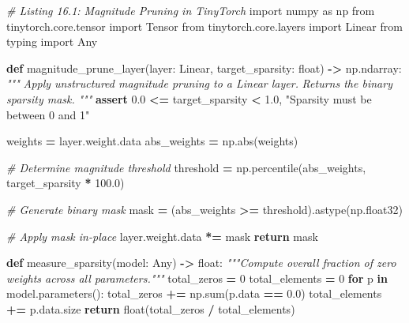 \documentclass[
  letterpaper,
]{scrbook}
\newenvironment{Shaded}{\begin{snugshade}}{\end{snugshade}}
\newcommand{\BuiltInTok}[1]{#1}
\newcommand{\CommentTok}[1]{\textcolor[rgb]{0.56,0.35,0.01}{\textit{#1}}}
\newcommand{\ControlFlowTok}[1]{\textcolor[rgb]{0.13,0.29,0.53}{\textbf{#1}}}
\newcommand{\DecValTok}[1]{\textcolor[rgb]{0.00,0.00,0.81}{#1}}
\newcommand{\FloatTok}[1]{\textcolor[rgb]{0.00,0.00,0.81}{#1}}
\newcommand{\ImportTok}[1]{#1}
\newcommand{\KeywordTok}[1]{\textcolor[rgb]{0.13,0.29,0.53}{\textbf{#1}}}
\newcommand{\NormalTok}[1]{#1}
\newcommand{\OperatorTok}[1]{\textcolor[rgb]{0.81,0.36,0.00}{\textbf{#1}}}
\newcommand{\StringTok}[1]{\textcolor[rgb]{0.31,0.60,0.02}{#1}}
\begin{document}
\begin{Shaded}
\begin{Highlighting}[]
\CommentTok{\# Listing 16.1: Magnitude Pruning in TinyTorch}
\ImportTok{import}\NormalTok{ numpy }\ImportTok{as}\NormalTok{ np}
\ImportTok{from}\NormalTok{ tinytorch.core.tensor }\ImportTok{import}\NormalTok{ Tensor}
\ImportTok{from}\NormalTok{ tinytorch.core.layers }\ImportTok{import}\NormalTok{ Linear}
\ImportTok{from}\NormalTok{ typing }\ImportTok{import}\NormalTok{ Any}

\KeywordTok{def}\NormalTok{ magnitude\_prune\_layer(layer: Linear, target\_sparsity: }\BuiltInTok{float}\NormalTok{) }\OperatorTok{{-}\textgreater{}}\NormalTok{ np.ndarray:}
    \CommentTok{"""}
\CommentTok{    Apply unstructured magnitude pruning to a Linear layer.}
\CommentTok{    Returns the binary sparsity mask.}
\CommentTok{    """}
    \ControlFlowTok{assert} \FloatTok{0.0} \OperatorTok{\textless{}=}\NormalTok{ target\_sparsity }\OperatorTok{\textless{}} \FloatTok{1.0}\NormalTok{, }\StringTok{"Sparsity must be between 0 and 1"}

\NormalTok{    weights }\OperatorTok{=}\NormalTok{ layer.weight.data}
\NormalTok{    abs\_weights }\OperatorTok{=}\NormalTok{ np.}\BuiltInTok{abs}\NormalTok{(weights)}

    \CommentTok{\# Determine magnitude threshold}
\NormalTok{    threshold }\OperatorTok{=}\NormalTok{ np.percentile(abs\_weights, target\_sparsity }\OperatorTok{*} \FloatTok{100.0}\NormalTok{)}

    \CommentTok{\# Generate binary mask}
\NormalTok{    mask }\OperatorTok{=}\NormalTok{ (abs\_weights }\OperatorTok{\textgreater{}=}\NormalTok{ threshold).astype(np.float32)}

    \CommentTok{\# Apply mask in{-}place}
\NormalTok{    layer.weight.data }\OperatorTok{*=}\NormalTok{ mask}
    \ControlFlowTok{return}\NormalTok{ mask}

\KeywordTok{def}\NormalTok{ measure\_sparsity(model: Any) }\OperatorTok{{-}\textgreater{}} \BuiltInTok{float}\NormalTok{:}
    \CommentTok{"""Compute overall fraction of zero weights across all parameters."""}
\NormalTok{    total\_zeros }\OperatorTok{=} \DecValTok{0}
\NormalTok{    total\_elements }\OperatorTok{=} \DecValTok{0}
    \ControlFlowTok{for}\NormalTok{ p }\KeywordTok{in}\NormalTok{ model.parameters():}
\NormalTok{        total\_zeros }\OperatorTok{+=}\NormalTok{ np.}\BuiltInTok{sum}\NormalTok{(p.data }\OperatorTok{==} \FloatTok{0.0}\NormalTok{)}
\NormalTok{        total\_elements }\OperatorTok{+=}\NormalTok{ p.data.size}
    \ControlFlowTok{return} \BuiltInTok{float}\NormalTok{(total\_zeros }\OperatorTok{/}\NormalTok{ total\_elements)}
\end{Highlighting}
\end{Shaded}
\end{document}
